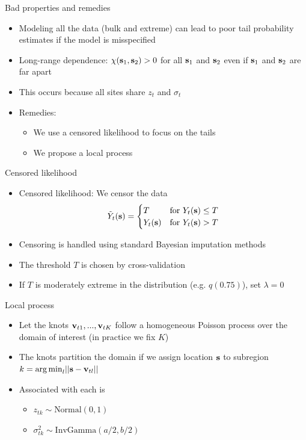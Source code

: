 \documentclass{beamer}
\begin{document}
\begin{frame}{Bad properties and remedies}
	\begin{itemize}\setlength{\itemsep}{1em}
	 	\item Modeling all the data (bulk and extreme) can lead to poor tail probability estimates if the model is misspecified
	 	\item Long-range dependence: $\chi(\mathbf{s}_1,\mathbf{s}_2)>0$ for all $\mathbf{s}_1$ and $\mathbf{s}_2$ even if $\mathbf{s}_1$ and $\mathbf{s}_2$ are far apart
	 	\item This occurs because all sites share $z_t$ and $\sigma_t$
	 	\item Remedies: \vspace{0.5em}
	 	\begin{itemize}\setlength{\itemsep}{0.5em}
		 	\item We use a censored likelihood to focus on the tails
		 	\item We propose a local \skewt{} process
		 \end{itemize}
	\end{itemize}
\end{frame}

\begin{frame}{Censored likelihood}
	\begin{itemize}\setlength{\itemsep}{1em}
		\item Censored likelihood: We censor the data
		$${\tilde Y}_t(\mathbf{s}) =\begin{cases}
			T 		 & \text{for } Y_t(\mathbf{s})\le T\\
		 	Y_t(\mathbf{s}) & \text{for } Y_t(\mathbf{s})>T
		\end{cases}$$
		\item Censoring is handled using standard Bayesian imputation methods
		\item The threshold $T$ is chosen by cross-validation
		\item If $T$ is moderately extreme in the distribution (e.g. $q(0.75)$), set $\lambda = 0$
	\end{itemize}
\end{frame}

\begin{frame}{Local \skewt{} process}
	\begin{itemize}\setlength\itemsep{1em}
		\item Let the knots $\mathbf{v}_{t1},...,\mathbf{v}_{tK}$ follow a homogeneous Poisson process over the domain of interest (in practice we fix $K$)
		\item The knots partition the domain if we assign location $\mathbf{s}$ to subregion $k={\mathop{\rm arg\, min}}_{l}||\mathbf{s}-\mathbf{v}_{tl}||$
		\item Associated with each is \vspace{0.5em}
		\begin{itemize} \setlength{\itemsep}{0.5em}
			\item $z_{tk}\sim\mbox{Normal}(0,1)$
			\item $\sigma_{tk}^2\sim\mbox{InvGamma}(a/2,b/2)$
		\end{itemize}
	\end{itemize}
\end{frame}
\end{document}
